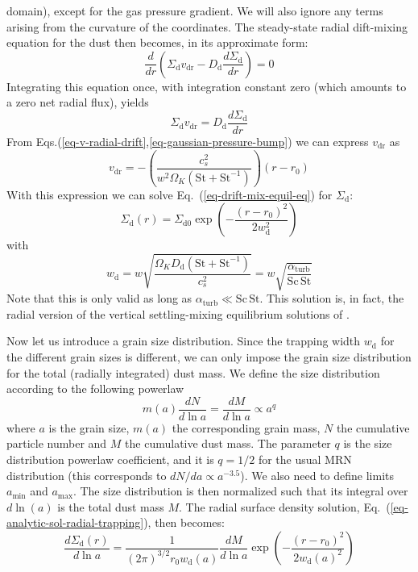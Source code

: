 \documentclass{aa}
\begin{document}
domain), except for the gas pressure gradient. We will also ignore any terms
arising from the curvature of the coordinates. The steady-state radial
dift-mixing equation for the dust then becomes, in its approximate form:
\begin{equation}
  \frac{d}{dr}
  \left(\Sigma_{\mathrm{d}}v_{\mathrm{dr}}-D_{\mathrm{d}}\frac{d\Sigma_{\mathrm{d}}}{dr}\right) = 0
\end{equation}
Integrating this equation once, with integration constant zero (which
amounts to a zero net radial flux), yields
\begin{equation}\label{eq-drift-mix-equil-eq}
  \Sigma_{\mathrm{d}}v_{\mathrm{dr}} = D_{\mathrm{d}}\frac{d\Sigma_{\mathrm{d}}}{dr}
\end{equation}
From Eqs.(\ref{eq-v-radial-drift},\ref{eq-gaussian-pressure-bump}) we can express
$v_{\mathrm{dr}}$ as
\begin{equation}
v_{\mathrm{dr}} = -\left(\frac{c_s^2}{w^2\Omega_K(\mathrm{St}+\mathrm{St}^{-1})}\right)(r-r_0)
\end{equation}
With this expression we can solve Eq.~(\ref{eq-drift-mix-equil-eq}) for
$\Sigma_{\mathrm{d}}$:
\begin{equation}\label{eq-analytic-sol-radial-trapping}
\Sigma_{\mathrm{d}}(r) = \Sigma_{\mathrm{d0}} \exp\left(-\frac{(r-r_0)^2}{2w_{\mathrm{d}}^2}\right)
\end{equation}
with 
\begin{equation}
  w_{\mathrm{d}} = w \sqrt{\frac{\Omega_KD_{\mathrm{d}}(\mathrm{St}+\mathrm{St}^{-1})}{c_s^2}}
  = w\sqrt{\frac{\alpha_{\mathrm{turb}}}{\mathrm{Sc}\,\mathrm{St}}}
\end{equation}
Note that this is only valid as long as $\alpha_{\mathrm{turb}}\ll \mathrm{Sc}\,\mathrm{St}$.
This solution is, in fact, the radial version of the vertical settling-mixing
equilibrium solutions of \citet{1995Icar..114..237D}.

Now let us introduce a grain size distribution. Since the trapping width
$w_{\mathrm{d}}$ for the different grain sizes is different, we can only
impose the grain size distribution for the total (radially integrated)
dust mass. We define the size distribution according to the following powerlaw
\begin{equation}
m(a)\frac{dN}{d\ln a} = \frac{dM}{d\ln a} \propto a^{q}
\end{equation}
where $a$ is the grain size, $m(a)$ the corresponding grain mass, $N$ the
cumulative particle number and $M$ the cumulative dust mass. The parameter $q$
is the size distribution powerlaw coefficient, and it is $q=1/2$ for the usual
MRN distribution (this corresponds to $dN/da\propto a^{-3.5}$). We also need to
define limits $a_{\mathrm{min}}$ and $a_{\mathrm{max}}$. The size distribution
is then normalized such that its integral over $d\ln(a)$ is the total dust mass
$M$. The radial surface density solution,
Eq.~(\ref{eq-analytic-sol-radial-trapping}), then becomes:
\begin{equation}\label{eq-analytic-sol-radial-trapping-sizedistr}
\frac{d\Sigma_{\mathrm{d}}(r)}{d\ln a} = \frac{1}{(2\pi)^{3/2}r_0
    w_{\mathrm{d}}(a)}\frac{dM}{d\ln a}
\exp\left(-\frac{(r-r_0)^2}{2w_{\mathrm{d}}(a)^2}\right)
\end{equation}
\end{document}
